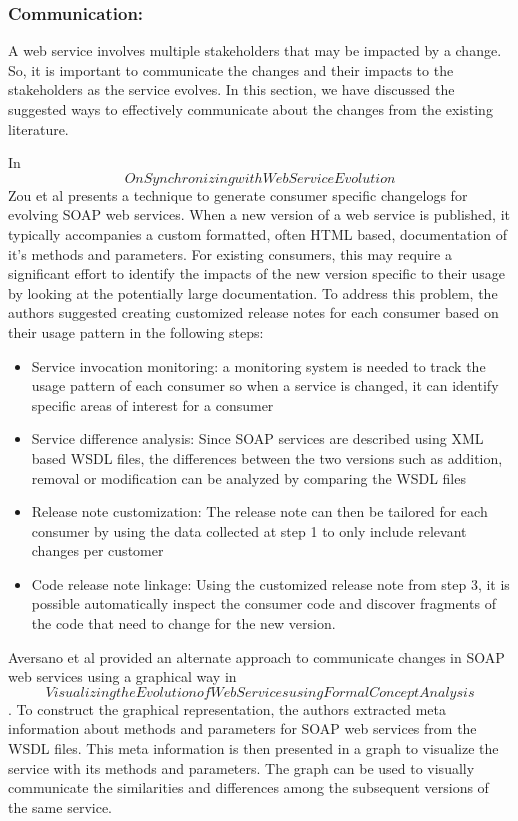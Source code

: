 \documentclass[runningheads,a4paper]{llncs}
\begin{document}
\subsubsection{Communication:}
A web service involves multiple stakeholders that may be impacted by a change. So, it is important to communicate the changes and their impacts to the stakeholders as the service evolves. In this section, we have discussed the suggested ways to effectively communicate about the changes from the existing literature.

In \[On Synchronizing with Web Service Evolution\] Zou et al presents a technique to generate consumer specific changelogs for evolving SOAP web services. When a new version of a web service is published, it typically accompanies a custom formatted, often HTML based, documentation of it’s methods and parameters. For existing consumers, this may require a significant effort to identify the impacts of the new version specific to their usage by looking at the potentially large documentation. To address this problem, the authors suggested creating customized release notes for each consumer based on their usage pattern in the following steps:

\begin{itemize}
  \item Service invocation monitoring: a monitoring system is needed to track the usage pattern of each consumer so when a service is changed, it can identify specific areas of interest for a consumer
  \item Service difference analysis: Since SOAP services are described using XML based WSDL files, the differences between the two versions such as addition, removal or modification can be analyzed by comparing the WSDL files
  \item Release note customization: The release note can then be tailored for each consumer by using the data collected at step 1 to only include relevant changes per customer
  \item Code release note linkage: Using the customized release note from step 3, it is possible automatically inspect the consumer code and discover fragments of the code that need to change for the new version.
\end{itemize}

Aversano et al provided an alternate approach to communicate changes in SOAP web services using a graphical way in \[Visualizing the Evolution of Web Services using Formal Concept Analysis\]. To construct the graphical representation, the authors extracted meta information about methods and parameters for SOAP web services from the WSDL files. This meta information is then presented in a graph to visualize the service with its methods and parameters. The graph can be used to visually communicate the similarities and differences among the subsequent versions of the same service.
\end{document}
